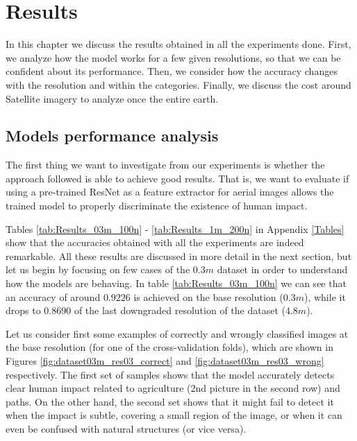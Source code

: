 
\chapter{Results} 

\label{Chapter5}


In this chapter we discuss the results obtained in all the experiments done. First, we analyze how the model works for a few given resolutions, so that we can be confident about its performance. Then, we consider how the accuracy changes with the resolution and within the categories. Finally, we discuss the cost around Satellite imagery to analyze once the entire earth. 

\section{Models performance analysis}

The first thing we want to investigate from our experiments is whether the approach followed is able to achieve good results. That is, we want to evaluate if using a pre-trained ResNet as a feature extractor for aerial images allows the trained model to properly discriminate the existence of human impact. 

Tables \ref{tab:Results_03m_100n} - \ref{tab:Results_1m_200n} in Appendix \ref{Tables} show that the accuracies obtained with all the experiments are indeed remarkable. All these results are discussed in more detail in the next section, but let us begin by focusing on few cases of the $0.3m$ dataset in order to understand how the models are behaving. In table \ref{tab:Results_03m_100n} we can see that an accuracy of around $0.9226$ is achieved on the base resolution ($0.3m$), while it drops to $0.8690$ of the last downgraded resolution of the dataset ($4.8m$).

Let us consider first some examples of correctly and wrongly classified images at the base resolution (for one of the cross-validation folds), which are shown in Figures \ref{fig:dataset03m_res03_correct} and \ref{fig:dataset03m_res03_wrong} respectively. The first set of samples shows that the model accurately detects clear human impact related to agriculture (2nd picture in the second row) and paths. On the other hand, the second set shows that it might fail to detect it when the impact is subtle, covering a small region of the image, or when it can even be confused with natural structures (or vice versa).

